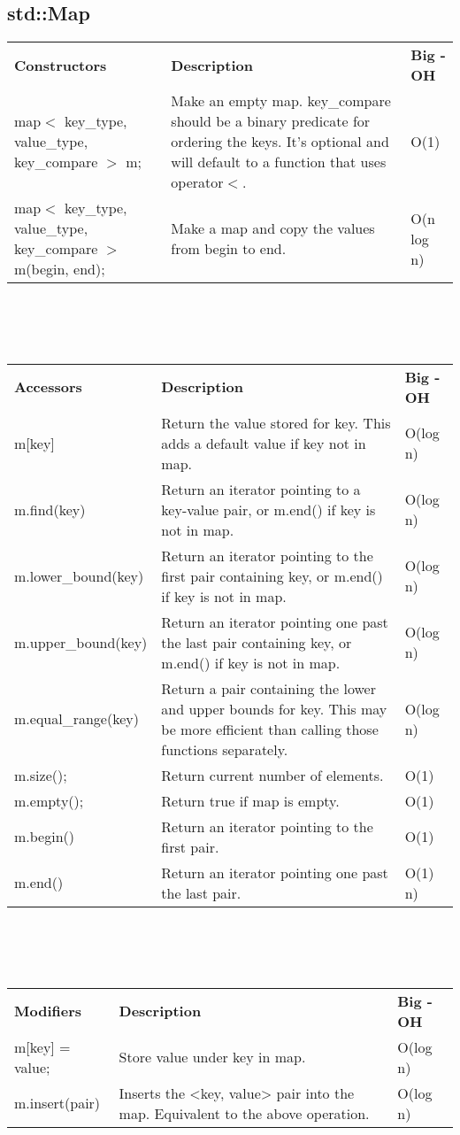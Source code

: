 \documentclass[12pt]{article}
\begin{document}
\subsection{std::Map} 
\begin{tabular}{ p{5cm} p{7cm}  p{5cm} }
\textbf{Constructors} & \textbf{Description} & \textbf{Big - OH}\\
map$<$ key\_type, value\_type, key\_compare $>$ m; & Make an empty map. key\_compare should be a binary predicate for ordering the keys. It's optional and will default to a function that uses operator$<$. & O(1)\\
map$<$ key\_type, value\_type, key\_compare $>$ m(begin, end); & Make a map and copy the values from begin to end. & O(n log n)
\end{tabular}
\\
\\
\\
\begin{tabular}{ p{5cm} p{7cm}  p{5cm} }
\textbf{Accessors} & \textbf{Description} & \textbf{Big - OH}\\
m[key] & Return the value stored for key. This adds a default value if key not in map. & O(log n)\\
m.find(key) & Return an iterator pointing to a key-value pair, or m.end() if key is not in map. & O(log n)\\
m.lower\_bound(key) & Return an iterator pointing to the first pair containing key, or m.end() if key is not in map. & O(log n)\\
m.upper\_bound(key) & Return an iterator pointing one past the last pair containing key, or m.end() if key is not in map. & O(log n)\\
m.equal\_range(key) & Return a pair containing the lower and upper bounds for key. This may be more efficient than calling those functions separately. & O(log n)\\
m.size(); & Return current number of elements. & O(1)\\
m.empty(); & Return true if map is empty. & O(1)\\
m.begin() & Return an iterator pointing to the first pair. & O(1)\\
m.end() & Return an iterator pointing one past the last pair. & O(1) n)
\end{tabular}
\\
\\
\\
\begin{tabular}{ p{5cm} p{7cm}  p{5cm} }
\textbf{Modifiers} & \textbf{Description} & \textbf{Big - OH}\\
m[key] = value; & Store value under key in map. & O(log n)\\
m.insert(pair) & Inserts the <key, value> pair into the map. Equivalent to the above operation. & O(log n)
\end{tabular}
\end{document}
